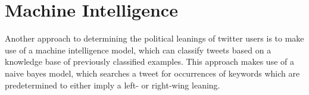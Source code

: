 \chapter{Machine Intelligence}\label{MiModel}
Another approach to determining the political leanings of twitter users is to
make use of a machine intelligence model, which can classify tweets based on a
knowledge base of previously classified examples. This approach makes use of a
naive bayes model, which searches a tweet for occurrences of keywords which are
predetermined to either imply a left- or right-wing leaning.
